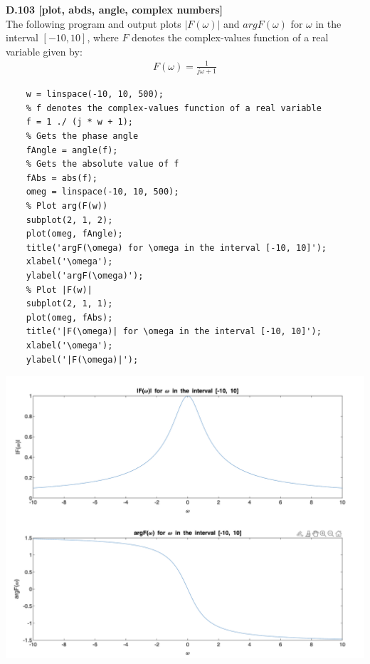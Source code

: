 \documentclass{article}
\begin{document}
\bigskip
{\bf D.103 [plot, abds, angle, complex numbers]}\\
The following program and output plots $|F(\omega)|$ and $argF(\omega)$ for $\omega$ in the interval $[-10, 10]$, where $F$ denotes the complex-values function of a real variable given by:
\begin{equation*}
\begin{split}
    F(\omega) = \frac{1}{j \omega + 1}
\end{split}
\end{equation*}

\begin{lstlisting}
    w = linspace(-10, 10, 500);
    % f denotes the complex-values function of a real variable
    f = 1 ./ (j * w + 1);
    % Gets the phase angle
    fAngle = angle(f);
    % Gets the absolute value of f
    fAbs = abs(f);
    omeg = linspace(-10, 10, 500);
    % Plot arg(F(w))
    subplot(2, 1, 2);
    plot(omeg, fAngle);
    title('argF(\omega) for \omega in the interval [-10, 10]');
    xlabel('\omega');
    ylabel('argF(\omega)');
    % Plot |F(w)|
    subplot(2, 1, 1);
    plot(omeg, fAbs);
    title('|F(\omega)| for \omega in the interval [-10, 10]');
    xlabel('\omega');
    ylabel('|F(\omega)|');
\end{lstlisting}

\begin{center}
    \includegraphics[width=1\textwidth]{103.png}
\end{center}
\end{document}
